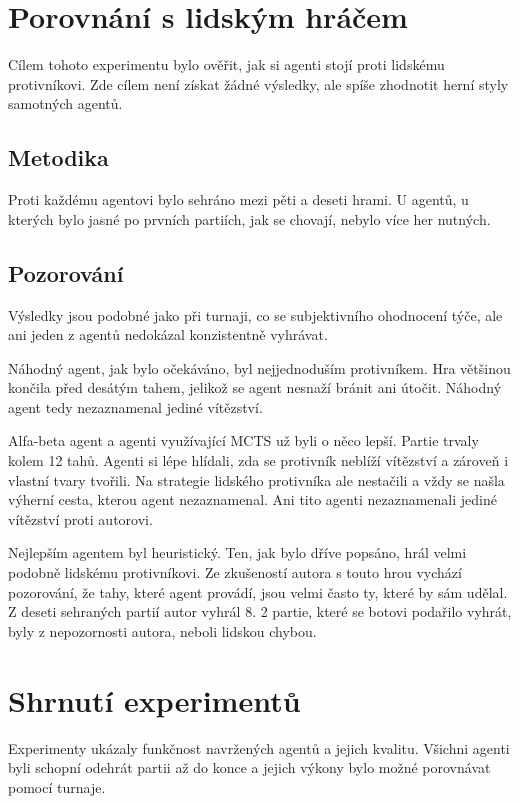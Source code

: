 \section{Porovnání s lidským hráčem}

Cílem tohoto experimentu bylo ověřit, jak si agenti stojí proti lidskému protivníkovi. Zde cílem není získat žádné výsledky, ale spíše zhodnotit 
herní styly samotných agentů.

\subsection{Metodika}

Proti každému agentovi bylo sehráno mezi pěti a deseti hrami. U agentů, u kterých bylo jasné po prvních partiích, jak se chovají, nebylo více her nutných.

\subsection{Pozorování}

Výsledky jsou podobné jako při turnaji, co se subjektivního ohodnocení týče, ale ani jeden z agentů nedokázal konzistentně vyhrávat.

Náhodný agent, jak bylo očekáváno, byl nejjednoduším protivníkem. Hra většinou končila před desátým tahem, jelikož se agent nesnaží bránit ani útočit.
Náhodný agent tedy nezaznamenal jediné vítězství.

Alfa-beta agent a agenti využívající MCTS už byli o něco lepší. Partie trvaly kolem 12 tahů. Agenti si lépe hlídali, zda se protivník neblíží vítězství
a zároveň i vlastní tvary tvořili. Na strategie lidského protivníka ale nestačili a vždy se našla výherní cesta, kterou agent nezaznamenal. Ani tito
agenti nezaznamenali jediné vítězství proti autorovi.

Nejlepším agentem byl heuristický. Ten, jak bylo dříve popsáno, hrál velmi podobně lidskému protivníkovi. Ze zkušeností autora s touto hrou vychází pozorování,
že tahy, které agent provádí, jsou velmi často ty, které by sám udělal. Z deseti sehraných partií autor vyhrál 8. 2 partie, které se botovi podařilo vyhrát,
byly z nepozornosti autora, neboli lidskou chybou.

\section{Shrnutí experimentů}

Experimenty ukázaly funkčnost navržených agentů a jejich kvalitu. Všichni agenti byli schopní odehrát partii až do konce a jejich výkony bylo možné 
porovnávat pomocí turnaje.


